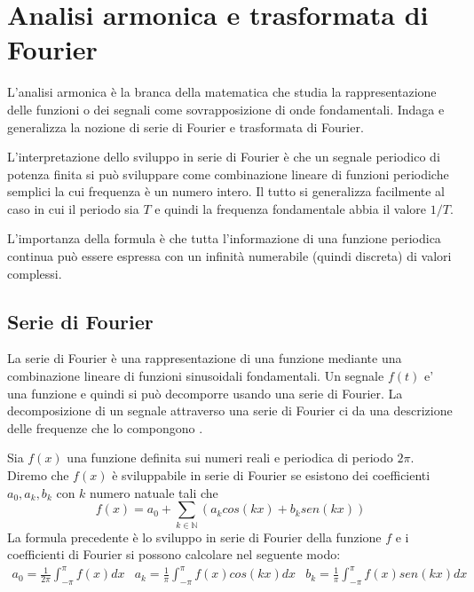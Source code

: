 \section{Analisi armonica e trasformata di Fourier}

L'analisi armonica \`e la branca della matematica che studia la rappresentazione delle funzioni o dei segnali come sovrapposizione di onde fondamentali. 
Indaga e generalizza la nozione di serie di Fourier e trasformata di Fourier. 


\begin{comment}
Data una funzione $s(t)$ reale o complessa a quadrato sommabile, periodica di periodo $2\pi$, per ogni $n$ intero esistono i coefficienti complessi:
\[
c_{n} = \frac{1}{2\pi} \int_{0}^{2\pi}e^{i\cdot n\cdot t}s(t)dt
\]
e la funzione pu\`o essere rappresentata come
\[
s(t) = \sum_{n=-\infty}^{\infty} c_{n} e^{i\cdot n\cdot t}
\]
\end{comment}

L'interpretazione dello sviluppo in serie di Fourier \`e che un segnale periodico di potenza finita si pu\`o sviluppare come combinazione lineare di funzioni periodiche semplici la cui frequenza \`e un numero intero. 
Il tutto si generalizza facilmente al caso in cui il periodo sia $T$ e quindi la frequenza fondamentale abbia il valore $1/T$. 

L'importanza della formula \`e che tutta l'informazione di una funzione periodica continua pu\`o essere espressa con un infinit\`a numerabile (quindi discreta) di valori complessi.


\subsection{Serie di Fourier}

La serie di Fourier \`e una rappresentazione di una funzione mediante una combinazione lineare di funzioni sinusoidali fondamentali.
Un segnale $f(t)$ e' una funzione e quindi si pu\`o decomporre usando una serie di Fourier. La decomposizione di un segnale attraverso una serie di Fourier ci da una descrizione delle frequenze che lo compongono \cite{fourier, fourier3}.

Sia $f(x)$ una funzione definita sui numeri reali e periodica di periodo $2\pi$. Diremo che $f(x)$ \`e sviluppabile in serie di Fourier se esistono dei coefficienti $a_{0}, a_{k}, b_{k}$ con $k$ numero natuale tali che
\[
  f(x) = a_{0} + \sum_{k\in \mathbb{N}} (a_{k} cos(kx) + b_{k} sen(kx))
\]
La formula precedente \`e lo sviluppo in serie di Fourier della funzione $f$ e i coefficienti di Fourier si possono calcolare nel seguente modo:
\[
  \begin{array}{lll}
      a_{0}=\frac{1}{2 \pi} \int_{-\pi}^{\pi} f(x) dx
    &
      a_{k}=\frac{1}{\pi} \int_{-\pi}^{\pi} f(x) cos(kx) dx
    &
      b_{k}=\frac{1}{\pi} \int_{-\pi}^{\pi} f(x) sen(kx) dx
  \end{array}
\]

